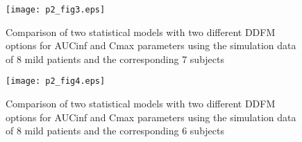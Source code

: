 \documentclass[final]{statistica}
\begin{document}
\vspace{3mm}
\FloatBarrier
\begin{figure}[h]
	\centering
	\caption{Comparison of two statistical models with two different DDFM options for AUCinf and Cmax parameters using the simulation data of 8 mild patients and the corresponding 7 subjects}\label{p2_fig3}	
	\texttt{[image: p2\_fig3.eps]}\\
\end{figure}

\vspace{3mm}

\FloatBarrier
\begin{figure}[h]
	\centering
	\caption{Comparison of two statistical models with two different DDFM options for AUCinf and Cmax parameters using the simulation data of 8 mild patients and the corresponding 6 subjects}\label{p2_fig4}	
	\texttt{[image: p2\_fig4.eps]}\\
\end{figure}

\vspace{3mm}
\end{document}
